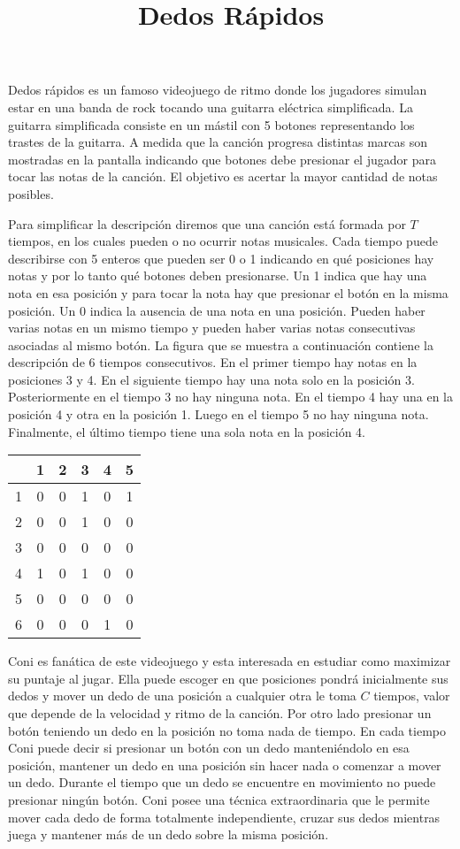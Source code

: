 \documentclass{oci}
\title{Dedos Rápidos}
\begin{document}
\begin{problemDescription}
  Dedos rápidos es un famoso videojuego de ritmo donde los jugadores simulan
  estar en una banda de rock tocando una guitarra eléctrica simplificada.
  La guitarra simplificada consiste en un mástil con 5 botones representando los
  trastes de la guitarra.
  A medida que la canción progresa distintas marcas son mostradas en la pantalla
  indicando que botones debe presionar el jugador para tocar las notas de la canción.
  El objetivo es acertar la mayor cantidad de notas posibles.

  Para simplificar la descripción diremos que una canción está formada por $T$
  tiempos, en los cuales pueden o no ocurrir notas musicales.
  Cada tiempo puede describirse con 5 enteros que pueden ser 0 o 1 indicando en
  qué posiciones hay notas y por lo tanto qué botones deben presionarse.
  Un 1 indica que hay una nota en esa posición y para tocar la nota hay que
  presionar el botón en la misma posición.
  Un 0 indica la ausencia de una nota en una posición.
  Pueden haber varias notas en un mismo tiempo y pueden haber varias
  notas consecutivas asociadas al mismo botón.
  La figura que se muestra a continuación contiene la descripción de 6 tiempos
  consecutivos.
  En el primer tiempo hay notas en la posiciones 3 y 4.
  En el siguiente tiempo hay una nota solo en la posición 3.
  Posteriormente en el tiempo 3 no hay ninguna nota.
  En el tiempo 4 hay una en la posición 4 y otra en la posición 1.
  Luego en el tiempo 5 no hay ninguna nota.
  Finalmente, el último tiempo tiene una sola nota en la posición 4.

  \begin{center}
    \begin{tabular}{r|ccccc}
        & 1 & 2 & 3 & 4 & 5 \\
      \hline
      1 & 0 & 0 & 1 & 0 & 1 \\
      2 & 0 & 0 & 1 & 0 & 0 \\
      3 & 0 & 0 & 0 & 0 & 0 \\
      4 & 1 & 0 & 1 & 0 & 0 \\
      5 & 0 & 0 & 0 & 0 & 0 \\
      6 & 0 & 0 & 0 & 1 & 0 \\
    \end{tabular}
  \end{center}

  Coni es fanática de este videojuego y esta interesada en estudiar como
  maximizar su puntaje al jugar.
  Ella puede escoger en que posiciones pondrá inicialmente sus dedos y mover un
  dedo de una posición a cualquier otra le toma $C$ tiempos, valor que depende
  de la velocidad y ritmo de la canción.
  Por otro lado presionar un botón teniendo un dedo en la posición no toma nada
  de tiempo.
  En cada tiempo Coni puede decir si presionar un botón con un dedo
  manteniéndolo en esa posición, mantener un dedo en una posición sin hacer nada
  o comenzar a mover un dedo.
  Durante el tiempo que un dedo se encuentre en movimiento no puede presionar
  ningún botón.
  Coni posee una técnica extraordinaria que le permite mover cada dedo
  de forma totalmente independiente, cruzar sus dedos mientras juega y mantener
  más de un dedo sobre la misma posición.


\end{problemDescription}
\end{document}
